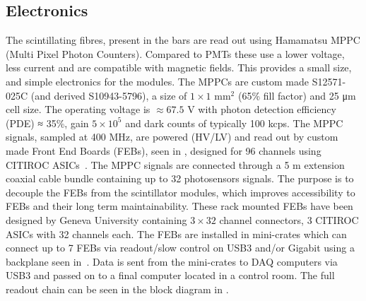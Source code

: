 
\subsection{Electronics}
The scintillating fibres, present in the bars are read out using Hamamatsu MPPC (Multi Pixel Photon Counters). Compared to PMTs these use a lower voltage, less current and are compatible with magnetic fields. This provides a small size, and simple electronics for the modules. The MPPCs are custom made S12571-025C (and derived S10943-5796), a size of $1\times1$ mm$^2$ (65\% fill factor) and 25 μm cell size. The operating voltage is $\approx 67.5$ V with photon detection efficiency (PDE) ≈ 35\%, gain $5 \times 10^5$ and dark counts of typically 100 kcps. The MPPC signals, sampled at 400 MHz, are powered (HV/LV) and read out by custom made Front End Boards (FEBs), seen in , designed for 96 channels using CITIROC ASICs~\cite{78EASIROC}. The MPPC signals are connected through a 5 m extension coaxial cable bundle containing up to 32 photosensors signals. The purpose is to decouple the FEBs from the scintillator modules, which improves accessibility to FEBs and their long term maintainability. These rack mounted FEBs have been designed by Geneva University containing $3 \times 32$ channel connectors, 3 CITIROC ASICs with 32 channels each. The FEBs are installed in mini-crates which can connect up to 7 FEBs via readout/slow control on USB3 and/or Gigabit using a backplane seen in~. 
Data is sent from the mini-crates to DAQ computers via USB3 and passed on to a final computer located in a control room. The full readout chain can be seen in the block diagram in .




